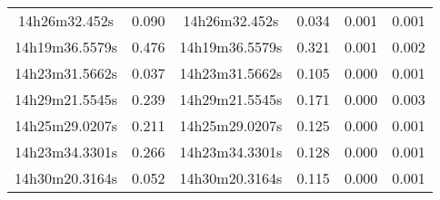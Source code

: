 \begin{table}
\begin{tabular}{cccccc}
14h26m32.452s & 0.090 & 14h26m32.452s & 0.034 & 0.001 & 0.001 \\
14h19m36.5579s & 0.476 & 14h19m36.5579s & 0.321 & 0.001 & 0.002 \\
14h23m31.5662s & 0.037 & 14h23m31.5662s & 0.105 & 0.000 & 0.001 \\
14h29m21.5545s & 0.239 & 14h29m21.5545s & 0.171 & 0.000 & 0.003 \\
14h25m29.0207s & 0.211 & 14h25m29.0207s & 0.125 & 0.000 & 0.001 \\
14h23m34.3301s & 0.266 & 14h23m34.3301s & 0.128 & 0.000 & 0.001 \\
14h30m20.3164s & 0.052 & 14h30m20.3164s & 0.115 & 0.000 & 0.001 \\
\end{tabular}
\end{table}

